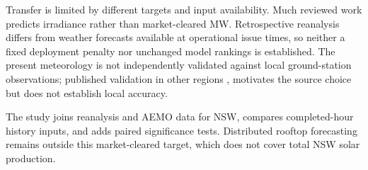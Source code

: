 Transfer is limited by different targets and input availability. Much reviewed work predicts irradiance rather than market-cleared MW. Retrospective reanalysis differs from weather forecasts available at operational issue times, so neither a fixed deployment penalty nor unchanged model rankings is established. The present meteorology is not independently validated against local ground-station observations; published validation in other regions \cite{pfenninger2016longterm}, \cite{ramirez2020simulation} motivates the source choice but does not establish local accuracy.

The study joins reanalysis and AEMO data for NSW, compares completed-hour history inputs, and adds paired significance tests. Distributed rooftop forecasting \cite{perera2022multires} remains outside this market-cleared target, which does not cover total NSW solar production.
